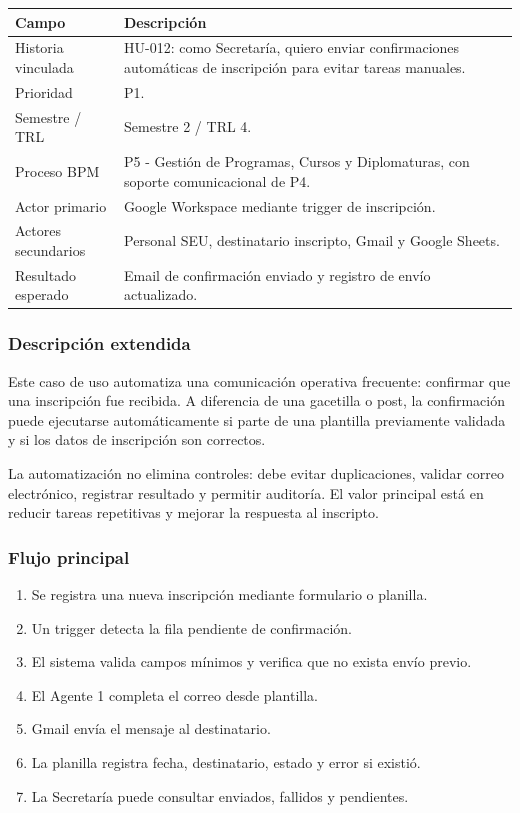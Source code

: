 \documentclass[11pt,a4paper]{article}
\begin{document}
\begin{tabularx}{\textwidth}{p{}Y}
\toprule
\textbf{Campo} & \textbf{Descripción} \\
\midrule
Historia vinculada & HU-012: como Secretaría, quiero enviar confirmaciones automáticas de inscripción para evitar tareas manuales. \\
Prioridad & P1. \\
Semestre / TRL & Semestre 2 / TRL 4. \\
Proceso BPM & P5 - Gestión de Programas, Cursos y Diplomaturas, con soporte comunicacional de P4. \\
Actor primario & Google Workspace mediante trigger de inscripción. \\
Actores secundarios & Personal SEU, destinatario inscripto, Gmail y Google Sheets. \\
Resultado esperado & Email de confirmación enviado y registro de envío actualizado. \\
\bottomrule
\end{tabularx}

\subsubsection{Descripción extendida}

Este caso de uso automatiza una comunicación operativa frecuente: confirmar que una inscripción fue recibida. A diferencia de una gacetilla o post, la confirmación puede ejecutarse automáticamente si parte de una plantilla previamente validada y si los datos de inscripción son correctos.

La automatización no elimina controles: debe evitar duplicaciones, validar correo electrónico, registrar resultado y permitir auditoría. El valor principal está en reducir tareas repetitivas y mejorar la respuesta al inscripto.

\subsubsection{Flujo principal}

\begin{enumerate}
  \item Se registra una nueva inscripción mediante formulario o planilla.
  \item Un trigger detecta la fila pendiente de confirmación.
  \item El sistema valida campos mínimos y verifica que no exista envío previo.
  \item El Agente 1 completa el correo desde plantilla.
  \item Gmail envía el mensaje al destinatario.
  \item La planilla registra fecha, destinatario, estado y error si existió.
  \item La Secretaría puede consultar enviados, fallidos y pendientes.
\end{enumerate}
\end{document}
